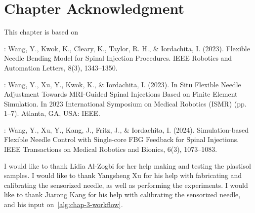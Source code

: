 
\section{Chapter Acknowledgment}
\label{sec:chap-3-ack}
This chapter is based on

\parencite{wangFlexibleNeedleBending2023}: Wang, Y., Kwok, K., Cleary, K., Taylor, R. H., \& Iordachita, I. (2023). Flexible Needle Bending Model for Spinal Injection Procedures. IEEE Robotics and Automation Letters, 8(3), 1343–1350.

\parencite{wangSituFlexibleNeedle2023}: Wang, Y., Xu, Y., Kwok, K., \& Iordachita, I. (2023). In Situ Flexible Needle Adjustment Towards MRI-Guided Spinal Injections Based on Finite Element Simulation. In 2023 International Symposium on Medical Robotics (ISMR) (pp. 1–7). Atlanta, GA, USA: IEEE.

\parencite{wangSimulationbasedFlexibleNeedle2024}: Wang, Y., Xu, Y., Kang, J., Fritz, J., \& Iordachita, I. (2024). Simulation-based Flexible Needle Control with Single-core FBG Feedback for Spinal Injections. IEEE Transactions on Medical Robotics and Bionics, 6(3), 1073–1083. 

I would like to thank Lidia Al-Zogbi for her help making and testing the plastisol samples. I would like to thank Yangsheng Xu for his help with fabricating and calibrating the sensorized needle, as well as performing the experiments. I would like to thank Jiarong Kang for his help with calibrating the sensorized needle, and his input on~\cref{alg:chap-3-workflow}.

